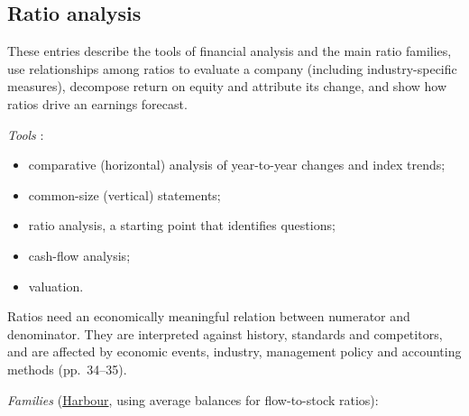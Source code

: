 \subsection{Ratio analysis}

These entries describe the tools of financial analysis and the main ratio families, use relationships among ratios to evaluate a company (including industry-specific measures), decompose return on equity and attribute its change, and show how ratios drive an earnings forecast.

\begin{qfmethod}\label{meth:financial-ratio-families}
 \emph{Tools} \citep[pp.~28--35]{financial-statement-analysis-2009}:
\begin{itemize}
\item comparative (horizontal) analysis of year-to-year changes and index trends;
\item common-size (vertical) statements;
\item ratio analysis, a starting point that identifies questions;
\item cash-flow analysis;
\item valuation.
\end{itemize}
Ratios need an economically meaningful relation between numerator and denominator. They are interpreted against history, standards and competitors, and are affected by economic events, industry, management policy and accounting methods (pp.~34--35).

\emph{Families} (\hyperref[ex:harbour-tools-statements]{Harbour}, using average balances for flow-to-stock ratios):


\end{qfmethod}
